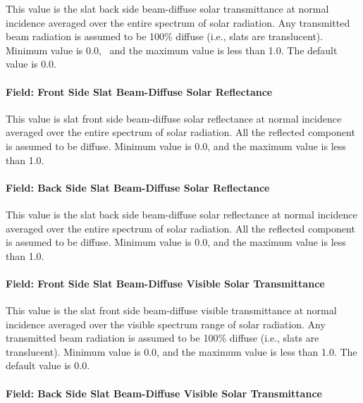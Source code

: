 This value is the slat back side beam-diffuse solar transmittance at normal incidence averaged over the entire spectrum of solar radiation. Any transmitted beam radiation is assumed to be 100\% diffuse (i.e., slats are translucent). Minimum value is 0.0,~ and the maximum value is less than 1.0. The default value is 0.0.

\paragraph{Field: Front Side Slat Beam-Diffuse Solar Reflectance}\label{field-front-side-slat-beam-diffuse-solar-reflectance}

This value is slat front side beam-diffuse solar reflectance at normal incidence averaged over the entire spectrum of solar radiation. All the reflected component is assumed to be diffuse. Minimum value is 0.0, and the maximum value is less than 1.0.

\paragraph{Field: Back Side Slat Beam-Diffuse Solar Reflectance}\label{field-back-side-slat-beam-diffuse-solar-reflectance}

This value is the slat back side beam-diffuse solar reflectance at normal incidence averaged over the entire spectrum of solar radiation. All the reflected component is assumed to be diffuse. Minimum value is 0.0, and the maximum value is less than 1.0.

\paragraph{Field: Front Side Slat Beam-Diffuse Visible Solar Transmittance}\label{field-front-side-slat-beam-diffuse-visible-solar-transmittance}

This value is the slat front side beam-diffuse visible transmittance at normal incidence averaged over the visible spectrum range of solar radiation. Any transmitted beam radiation is assumed to be 100\% diffuse (i.e., slats are translucent). Minimum value is 0.0, and the maximum value is less than 1.0. The default value is 0.0.

\paragraph{Field: Back Side Slat Beam-Diffuse Visible Solar Transmittance}\label{field-back-side-slat-beam-diffuse-visible-solar-transmittance}

